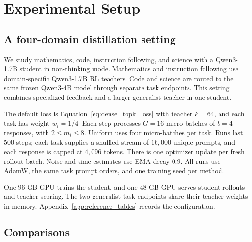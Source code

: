 \section{Experimental Setup}
\label{sec:experiments}

\subsection{A four-domain distillation setting}

We study mathematics, code, instruction following, and science with a
Qwen3-1.7B student in non-thinking mode. Mathematics and instruction
following use domain-specific Qwen3-1.7B RL teachers. Code and science
are routed to the same frozen Qwen3-4B model through separate task
endpoints. This setting combines specialized feedback and a larger
generalist teacher in one student.

The default loss is Equation~\ref{eq:dense_topk_loss} with teacher
$k=64$, and each task has weight $w_i=1/4$. Each step processes
$G=16$ micro-batches of $b=4$ responses, with $2\leq m_i\leq8$.
Uniform uses four micro-batches per task. Runs last $500$ steps;
each task supplies a shuffled stream of $16{,}000$ unique prompts,
and each response is capped at $4{,}096$ tokens. There is one optimizer
update per fresh rollout batch. Noise and time estimates use EMA decay
$0.9$. All runs use AdamW, the same task prompt orders, and one training
seed per method.

One $96$-GB GPU trains the student, and one $48$-GB GPU serves
student rollouts and teacher scoring. The two generalist task endpoints
share their teacher weights in memory. Appendix~\ref{app:reference_tables}
records the configuration.

\subsection{Comparisons}

